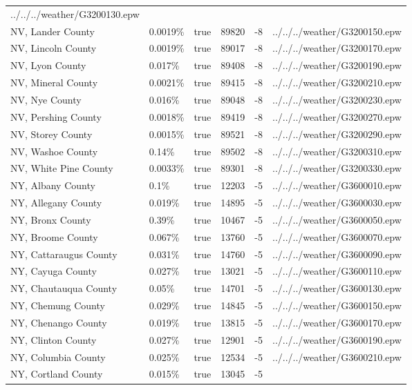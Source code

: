 \begin{longtable}[]{@{}llllll@{}}
../../../weather/G3200130.epw \\
NV, Lander County & 0.0019\% & true & 89820 & -8 &
../../../weather/G3200150.epw \\
NV, Lincoln County & 0.0019\% & true & 89017 & -8 &
../../../weather/G3200170.epw \\
NV, Lyon County & 0.017\% & true & 89408 & -8 &
../../../weather/G3200190.epw \\
NV, Mineral County & 0.0021\% & true & 89415 & -8 &
../../../weather/G3200210.epw \\
NV, Nye County & 0.016\% & true & 89048 & -8 &
../../../weather/G3200230.epw \\
NV, Pershing County & 0.0018\% & true & 89419 & -8 &
../../../weather/G3200270.epw \\
NV, Storey County & 0.0015\% & true & 89521 & -8 &
../../../weather/G3200290.epw \\
NV, Washoe County & 0.14\% & true & 89502 & -8 &
../../../weather/G3200310.epw \\
NV, White Pine County & 0.0033\% & true & 89301 & -8 &
../../../weather/G3200330.epw \\
NY, Albany County & 0.1\% & true & 12203 & -5 &
../../../weather/G3600010.epw \\
NY, Allegany County & 0.019\% & true & 14895 & -5 &
../../../weather/G3600030.epw \\
NY, Bronx County & 0.39\% & true & 10467 & -5 &
../../../weather/G3600050.epw \\
NY, Broome County & 0.067\% & true & 13760 & -5 &
../../../weather/G3600070.epw \\
NY, Cattaraugus County & 0.031\% & true & 14760 & -5 &
../../../weather/G3600090.epw \\
NY, Cayuga County & 0.027\% & true & 13021 & -5 &
../../../weather/G3600110.epw \\
NY, Chautauqua County & 0.05\% & true & 14701 & -5 &
../../../weather/G3600130.epw \\
NY, Chemung County & 0.029\% & true & 14845 & -5 &
../../../weather/G3600150.epw \\
NY, Chenango County & 0.019\% & true & 13815 & -5 &
../../../weather/G3600170.epw \\
NY, Clinton County & 0.027\% & true & 12901 & -5 &
../../../weather/G3600190.epw \\
NY, Columbia County & 0.025\% & true & 12534 & -5 &
../../../weather/G3600210.epw \\
NY, Cortland County & 0.015\% & true & 13045 & -5 &

\end{longtable}
